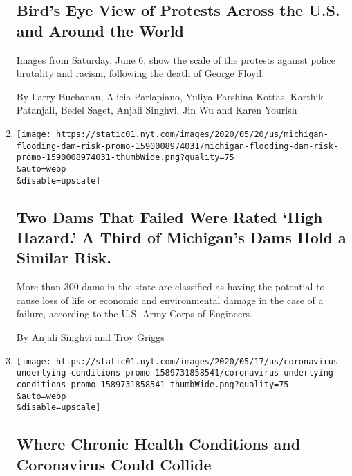\begin{enumerate}
{  \subsection{Bird's Eye View of Protests Across the U.S. and Around the
  World}\label{birds-eye-view-of-protests-across-the-us-and-around-the-world}}

  Images from Saturday, June 6, show the scale of the protests against
  police brutality and racism, following the death of George Floyd.

  By Larry Buchanan, Alicia Parlapiano, Yuliya Parshina-Kottas, Karthik
  Patanjali, Bedel Saget, Anjali Singhvi, Jin Wu and Karen Yourish
\item
  \href{/interactive/2020/05/20/us/michigan-flooding-dam-risk.html}{}

  \texttt{[image: https://static01.nyt.com/images/2020/05/20/us/michigan-flooding-dam-risk-promo-1590008974031/michigan-flooding-dam-risk-promo-1590008974031-thumbWide.png?quality=75\\\&auto=webp\\\&disable=upscale]}

  \hypertarget{two-dams-that-failed-were-rated-high-hazard-a-third-of-michigans-dams-hold-a-similar-risk}{%
  \subsection{Two Dams That Failed Were Rated `High Hazard.' A Third of
  Michigan's Dams Hold a Similar
  Risk.}\label{two-dams-that-failed-were-rated-high-hazard-a-third-of-michigans-dams-hold-a-similar-risk}}

  More than 300 dams in the state are classified as having the potential
  to cause loss of life or economic and environmental damage in the case
  of a failure, according to the U.S. Army Corps of Engineers.

  By Anjali Singhvi and Troy Griggs
\item
  \href{/interactive/2020/05/18/us/coronavirus-underlying-conditions.html}{}

  \texttt{[image: https://static01.nyt.com/images/2020/05/17/us/coronavirus-underlying-conditions-promo-1589731858541/coronavirus-underlying-conditions-promo-1589731858541-thumbWide.png?quality=75\\\&auto=webp\\\&disable=upscale]}

  \hypertarget{where-chronic-health-conditions-and-coronavirus-could-collide}{%
  \subsection{Where Chronic Health Conditions and Coronavirus Could
  Collide}\label{where-chronic-health-conditions-and-coronavirus-could-collide}}


\end{enumerate}
